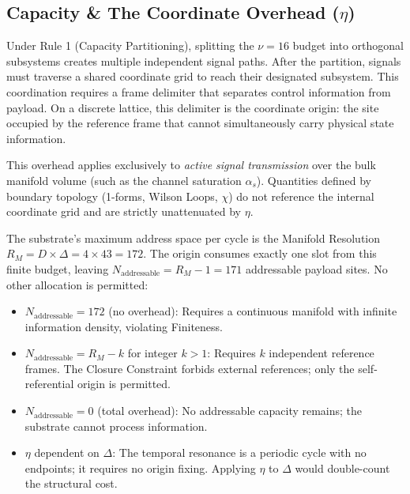 
\subsection{Capacity \& The Coordinate Overhead (\texorpdfstring{$\eta$}{eta})}

Under Rule 1 (Capacity Partitioning), splitting the $\nu = 16$ budget into orthogonal subsystems creates multiple independent signal paths. After the partition, signals must traverse a shared coordinate grid to reach their designated subsystem. This coordination requires a frame delimiter that separates control information from payload. On a discrete lattice, this delimiter is the coordinate origin: the site occupied by the reference frame that cannot simultaneously carry physical state information. 

This overhead applies exclusively to \textit{active signal transmission} over the bulk manifold volume (such as the channel saturation $\alpha_s$). Quantities defined by boundary topology (1-forms, Wilson Loops, $\chi$) do not reference the internal coordinate grid and are strictly unattenuated by $\eta$.

The substrate's maximum address space per cycle is the Manifold Resolution $R_M = D \times \Delta = 4 \times 43 = 172$. The origin consumes exactly one slot from this finite budget, leaving $N_{\text{addressable}} = R_M - 1 = 171$ addressable payload sites. No other allocation is permitted:

\begin{itemize}
    \item $N_{\text{addressable}} = 172$ (no overhead): Requires a continuous manifold with infinite information density, violating Finiteness.
    \item $N_{\text{addressable}} = R_M - k$ for integer $k > 1$: Requires $k$ independent reference frames. The Closure Constraint forbids external references; only the self-referential origin is permitted.
    \item $N_{\text{addressable}} = 0$ (total overhead): No addressable capacity remains; the substrate cannot process information.
    \item $\eta$ dependent on $\Delta$: The temporal resonance is a periodic cycle with no endpoints; it requires no origin fixing. Applying $\eta$ to $\Delta$ would double-count the structural cost.
\end{itemize}

